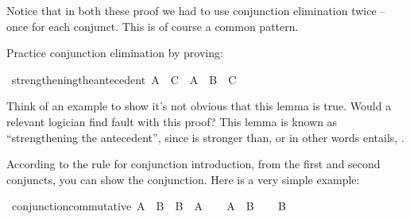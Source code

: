 \begin{isabellebody}
\isanewline
{}\isamarkupfalse%
%
\endisatagproof
{\isafoldproof}%
%
\isadelimproof
%
\endisadelimproof
%
\begin{isamarkuptext}%
Notice that in both these proof we had to use conjunction elimination twice -- once for each
conjunct. This is of course a common pattern.%
\end{isamarkuptext}\isamarkuptrue%
%
\begin{isamarkuptext}%
\begin{Exercise}[title = Strengthening the Antecedent] Practice conjunction elimination by proving: \end{Exercise}%
\end{isamarkuptext}\isamarkuptrue%
\isamarkupfalse%
\ strengthening{\isacharunderscore}the{\isacharunderscore}antecedent{\isacharcolon}\ {\isachardoublequoteopen}{\isacharparenleft}A\ {\isasymlongrightarrow}\ C{\isacharparenright}\ {\isasymlongrightarrow}\ {\isacharparenleft}A\ {\isasymand}\ B\ {\isasymlongrightarrow}\ C{\isacharparenright}{\isachardoublequoteclose}%
\isadelimproof
\ %
\endisadelimproof
%
\isatagproof
{}\isamarkupfalse%
%
\endisatagproof
{\isafoldproof}%
%
\isadelimproof
%
\endisadelimproof
%
\begin{isamarkuptext}%
Think of an example to show it's not obvious that this lemma is true. Would a relevant logician
find fault with this proof? This lemma is known as ``strengthening the antecedent'', since 
is stronger than, or in other words entails, .%
\end{isamarkuptext}\isamarkuptrue%
%
\isamarkuptrue%
%
\begin{isamarkuptext}%
According to the rule for conjunction introduction, from the first and second conjuncts, you
can show the conjunction. Here is a very simple example:%
\end{isamarkuptext}\isamarkuptrue%
\isamarkupfalse%
\ conjunction{\isacharunderscore}commutative{\isacharcolon}\ {\isachardoublequoteopen}A\ {\isasymand}\ B\ {\isasymlongrightarrow}\ B\ {\isasymand}\ A{\isachardoublequoteclose}\isanewline
%
\isadelimproof
%
\endisadelimproof
%
\isatagproof
{}\isamarkupfalse%
\isanewline
\ \ \isamarkupfalse%
\ {\isachardoublequoteopen}A\ {\isasymand}\ B{\isachardoublequoteclose}\isanewline
\ \ \isamarkupfalse%
\ {\isachardoublequoteopen}B{\isachardoublequoteclose}\isacommand{{\isachardot}{\isachardot}}\isamarkupfalse%

\end{isabellebody}
